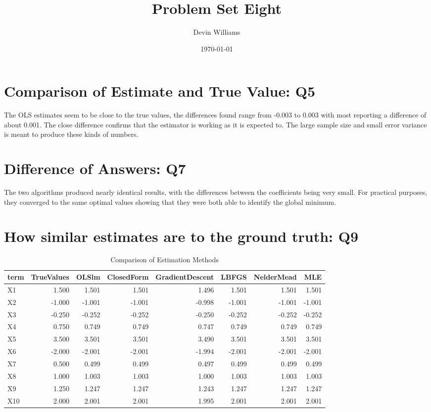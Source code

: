\documentclass[12pt,letterpaper]{article}
\title{\textbf{Problem Set Eight}}
\author{Devin Williams}
\date{\today}
\begin{document}
\maketitle

\section{Comparison of Estimate and True Value: Q5}
The OLS estimates seem to be close to the true values, the differences found range from -0.003 to 0.003 with most reporting a difference of about 0.001. The close difference confirms that the estimator is working as it is expected to. The large sample size and small error variance is meant to produce these kinds of numbers. 

\section{Difference of Answers: Q7}
The two algorithms produced nearly identical results, with the differences between the coefficients being very small. For practical purposes, they converged to the same optimal values showing that they were both able to identify the global minimum.  


\clearpage

\section{How similar estimates are to the ground truth: Q9}
\begin{table}[ht]
\centering
\caption{Comparison of Estimation Methods}
\begin{tabular}{l rrrrrrr }
\toprule
term & TrueValues & OLSlm & ClosedForm & GradientDescent & LBFGS & NelderMead & MLE \\
\midrule
X1  &  1.500 & 1.501 & 1.501 & 1.496 & 1.501 & 1.501 & 1.501 \\
X2  &  -1.000 & -1.001 & -1.001 & -0.998 & -1.001 & -1.001 & -1.001 \\
X3  &  -0.250 & -0.252 & -0.252 & -0.250 & -0.252 & -0.252 & -0.252 \\
X4  &  0.750 & 0.749 & 0.749 & 0.747 & 0.749 & 0.749 & 0.749 \\
X5  &  3.500 & 3.501 & 3.501 & 3.490 & 3.501 & 3.501 & 3.501 \\
X6  &  -2.000 & -2.001 & -2.001 & -1.994 & -2.001 & -2.001 & -2.001 \\
X7  &  0.500 & 0.499 & 0.499 & 0.497 & 0.499 & 0.499 & 0.499 \\
X8  &  1.000 & 1.003 & 1.003 & 1.000 & 1.003 & 1.003 & 1.003 \\
X9  &  1.250 & 1.247 & 1.247 & 1.243 & 1.247 & 1.247 & 1.247 \\
X10  &  2.000 & 2.001 & 2.001 & 1.995 & 2.001 & 2.001 & 2.001 \\
\bottomrule
\end{tabular}
\end{table}
\end{document}

